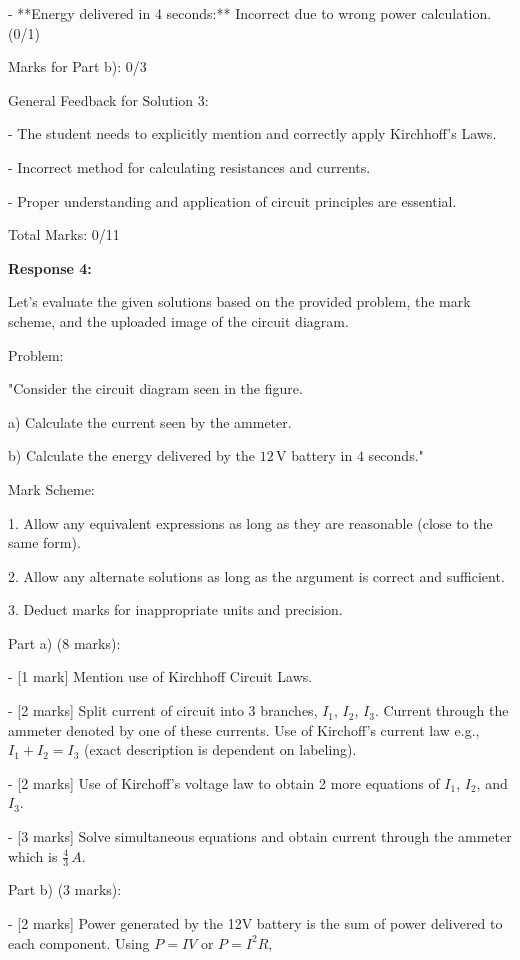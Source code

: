 \documentclass[a4paper,11pt]{article}
\begin{document}
- **Energy delivered in 4 seconds:** Incorrect due to wrong power calculation. (0/1)

Marks for Part b): 0/3

General Feedback for Solution 3:

- The student needs to explicitly mention and correctly apply Kirchhoff’s Laws.

- Incorrect method for calculating resistances and currents.

- Proper understanding and application of circuit principles are essential.

Total Marks: 0/11

\bigskip
\textbf{Response 4:}

Let's evaluate the given solutions based on the provided problem, the mark scheme, and the uploaded image of the circuit diagram.

Problem:

"Consider the circuit diagram seen in the figure.

a) Calculate the current seen by the ammeter.

b) Calculate the energy delivered by the \(12\, \text{V}\) battery in \(4\) seconds."

Mark Scheme:

1. Allow any equivalent expressions as long as they are reasonable (close to the same form).

2. Allow any alternate solutions as long as the argument is correct and sufficient.

3. Deduct marks for inappropriate units and precision.

Part a) (8 marks):

- [1 mark] Mention use of Kirchhoff Circuit Laws.

- [2 marks] Split current of circuit into 3 branches, \( I_1 \), \( I_2 \), \( I_3 \). Current through the ammeter denoted by one of these currents. Use of Kirchoff’s current law e.g., \( I_1 + I_2 = I_3 \) (exact description is dependent on labeling).

- [2 marks] Use of Kirchoff’s voltage law to obtain 2 more equations of \( I_1 \), \( I_2 \), and \( I_3 \).

- [3 marks] Solve simultaneous equations and obtain current through the ammeter which is \( \frac{4}{3} \, A \).

Part b) (3 marks):

- [2 marks] Power generated by the 12V battery is the sum of power delivered to each component. Using \( P = IV \) or \( P = I^2 R \),
\end{document}
